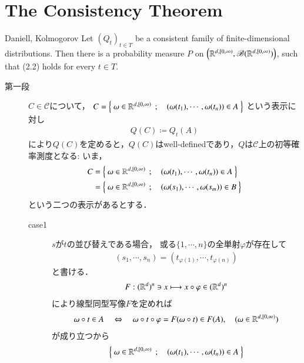 \section{The Consistency Theorem}
	\begin{itembox}[l]{Daniell, Kolmogorov}
			Let $(Q_t)_{t \in T}$ be a consistent family of finite-dimensional 
			distributions. Then there is a probability measure $P$ on 
			$\left( \mathbb{R}^{d,[0,\infty)}, \mathscr{B}(\mathbb{R}^{d,[0,\infty)}) \right)$, such that 
			(2.2) holds for every $t \in T$.
	\end{itembox}
	
	\begin{prf}\mbox{}
		\begin{description}
			\item[第一段]
				$C \in \mathscr{C}$について，
				$C = \left\{\ \omega \in \mathbb{R}^{d,[0,\infty)}\ \, ; \quad (\omega(t_1),\cdots,\omega(t_n)) \in A\ \right\}$
				という表示に対し
				\begin{align}
					Q(C) \coloneqq Q_t(A)
				\end{align}
				により$Q(C)$を定めると，$Q(C)$はwell-definedであり，$Q$は$\mathscr{C}$上の初等確率測度となる:
				いま，
				\begin{align}
					C 
					&= \left\{\ \omega \in \mathbb{R}^{d,[0,\infty)}\ \, ; \quad (\omega(t_1),\cdots,\omega(t_n)) \in A\ \right\} \\
					&= \left\{\ \omega \in \mathbb{R}^{d,[0,\infty)}\ \, ; \quad (\omega(s_1),\cdots,\omega(s_m)) \in B\ \right\} 
				\end{align}
				という二つの表示があるとする．
				\begin{description}
					\item[case1]
						$s$が$t$の並び替えである場合，
						或る$\{1,\cdots,n\}$の全単射$\varphi$が存在して
						\begin{align}
							(s_1,\cdots,s_n) 
							= (t_{\varphi(1)},\cdots,t_{\varphi(n)})
						\end{align}
						と書ける．
						\begin{align}
							F:(\mathbb{R}^d)^n \ni x \longmapsto x \circ \varphi \in (\mathbb{R}^d)^n
						\end{align}
						により線型同型写像$F$を定めれば
						\begin{align}
							\omega \circ t \in A
							\quad \Leftrightarrow \quad \omega \circ t \circ \varphi 
							= F(\omega \circ t) \in F(A),
							\quad (\omega \in \mathbb{R}^{d,[0,\infty)})
						\end{align}
						が成り立つから
						\begin{align}
							\Set{\omega \in \R^{d,[0,\infty)}}{(\omega(t_1),\cdots,\omega(t_n)) \in A}

\end{align}
\end{description}
\end{description}
\end{prf}
